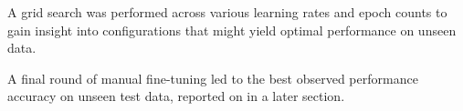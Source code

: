 A grid search was performed across various learning rates and epoch counts to gain insight into configurations that might yield optimal 
performance on unseen data. 

A final round of manual fine-tuning led to the best observed performance accuracy on unseen test data, reported on in a later section.

